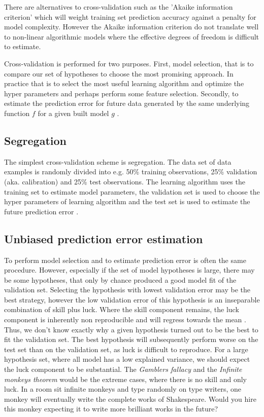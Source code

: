 There are alternatives to cross-validation such as the 'Akaike information criterion' which will weight training set prediction accuracy against a penalty for model complexity. However the Akaike information criterion do not translate well to non-linear algorithmic models where the effective degrees of freedom is difficult to estimate.

Cross-validation is performed for two purposes. First, model selection, that is to compare our set of hypotheses to choose the most promising approach. In practice that is to select the most useful learning algorithm and optimize the hyper parameters and perhaps perform some feature selection. Secondly, to estimate the prediction error for future data generated by the same underlying function $f$ for a given built model $g$ \cite{friedman2001elements}.

\subsection{Segregation}
The simplest cross-validation scheme is segregation. The data set of data examples is randomly divided into e.g. 50\% training observations, 25\% validation (aka. calibration) and 25\% test observations. The learning algorithm uses the training set to estimate model parameters, the validation set is used to choose the hyper parameters of learning algorithm and the test set is used to estimate the future prediction error \cite{friedman2001elements}.

\subsection{Unbiased prediction error estimation}
\label{unbiased_estimation}
To perform model selection and to estimate prediction error is often the same procedure. However, especially if the set of model hypotheses is large, there may be some hypotheses, that only by chance produced a good model fit of the validation set. Selecting the hypothesis with lowest validation error may be the best strategy, however the low validation error of this hypothesis is an inseparable combination of skill plus luck. Where the skill component remains, the luck component is inherently non reproducible and will regress towards the mean \cite{kahneman2011thinking}. Thus, we don't know exactly why a given hypothesis turned out to be the best to fit the validation set. The best hypothesis will subsequently perform worse on the test set than on the validation set, as luck is difficult to reproduce. For a large hypothesis set, where all model has a low explained variance, we should expect the luck component to be substantial. The \textit{Gamblers fallacy} and the \textit{Infinite monkeys theorem} would be the extreme cases, where there is no skill and only luck. In a room sit infinite monkeys and type randomly on type writers, one monkey will eventually write the complete works of Shakespeare. Would you hire this monkey expecting it to write more brilliant works in the future? \cite{wiki:gamblers,monkeys}

